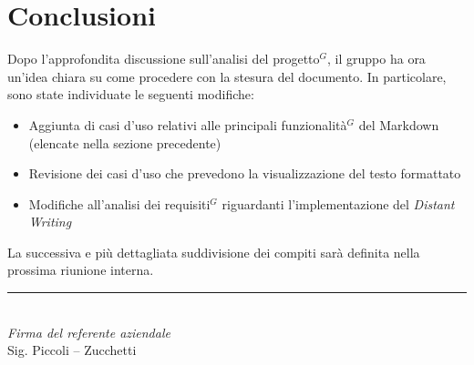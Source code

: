 \documentclass[a4paper,10pt]{article}
\begin{document}
\section*{Conclusioni}
Dopo l’approfondita discussione sull’analisi del progetto$^G$, il gruppo ha ora un’idea chiara su come procedere con la stesura del documento. In particolare, sono state individuate le seguenti modifiche:
\begin{itemize}
\item Aggiunta di casi d’uso relativi alle principali funzionalità$^G$ del Markdown (elencate nella sezione precedente)
\item Revisione dei casi d’uso che prevedono la visualizzazione del testo formattato
\item Modifiche all’analisi dei requisiti$^G$ riguardanti l’implementazione del \emph{Distant Writing}
\end{itemize}
La successiva e più dettagliata suddivisione dei compiti sarà definita nella prossima riunione interna.

\vspace{2cm}
\begin{flushright}
  \noindent\rule{6cm}{0.4pt}\\
  \textit{Firma del referente aziendale}\\
  Sig. Piccoli – Zucchetti
\end{flushright}
\end{document}

